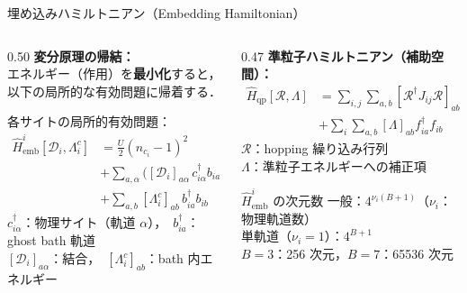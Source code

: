 \documentclass[12pt,aspectratio=169]{beamer}
\begin{document}
\begin{frame}[shrink=5]{埋め込みハミルトニアン（Embedding Hamiltonian）}
  \begin{columns}[T]
    \begin{column}{0.50\textwidth}
      {\footnotesize \textbf{変分原理の帰結：}\\
      エネルギー（作用）を\textbf{最小化}すると，\\
      以下の局所的な有効問題に帰着する．}

      \medskip
      各サイトの局所的有効問題：
      \begin{align*}
        \hat{H}^i_\mathrm{emb}[\mathcal{D}_i,\Lambda^c_i] &=
          \frac{U}{2}(\hat{n}_{c_i}-1)^2\\
          &+\sum_{a,\alpha}\bigl([\mathcal{D}_i]_{a\alpha}\,c^\dagger_{i\alpha} b_{ia}+\mathrm{h.c.}\bigr)\\
          &+\sum_{a,b}[\Lambda^c_i]_{ab}\,b^\dagger_{ia}b_{ib}
      \end{align*}
      \small
      $c^\dagger_{i\alpha}$：物理サイト（軌道 $\alpha$），\ $b_{ia}^\dagger$：ghost bath 軌道\\
      $[\mathcal{D}_i]_{a\alpha}$：結合，\ $[\Lambda^c_i]_{ab}$：bath 内エネルギー

      \smallskip
    \end{column}

    \begin{column}{0.47\textwidth}
      \textbf{準粒子ハミルトニアン（補助空間）：}
      {\small
      \begin{align*}
        \hat{H}_\mathrm{qp}[\mathcal{R},\Lambda] &=
          \sum_{i,j}\sum_{a,b}
          [\mathcal{R}^\dagger J_{ij}\mathcal{R}]_{ab}
          f^\dagger_{ia}f_{jb}\\
          &+\sum_{i}\sum_{a,b}[\Lambda]_{ab}f^\dagger_{ia}f_{ib}
      \end{align*}
      }
      \small
      $\mathcal{R}$：hopping 繰り込み行列\\
      $\Lambda$：準粒子エネルギーへの補正項

      \smallskip
      \begin{block}{\small $\hat{H}^i_\mathrm{emb}$ の次元数}
        \small
        一般：$4^{\nu_i(B+1)}$（$\nu_i$：物理軌道数）\\
        単軌道（$\nu_i=1$）：$4^{B+1}$\\
        \quad $B=3$：256 次元，$B=7$：65536 次元
      \end{block}
    \end{column}
  \end{columns}
\end{frame}
\end{document}
